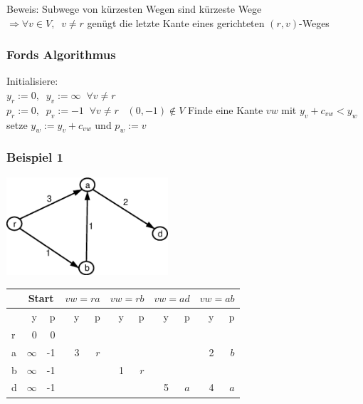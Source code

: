 Beweis: Subwege von kürzesten Wegen sind kürzeste Wege\\
$\Rightarrow \forall v \in V, \; \; v \not=r$ genügt die letzte Kante
eines gerichteten $(r,v)$-Weges

\subsubsection{Fords Algorithmus}

\begin{algorithmic}
\STATE Initialisiere:\\
$y_{r} := 0, \; \; y_{v} := \infty \; \; \forall v \not= r$\\
$p_{r} := 0, \; \; p_{v} := -1 \; \; \forall v \not= r\; \; \; (0,-1) \not
\in V$
\STATE Finde eine Kante $v w$ mit $y_{v} + c_{v w} < y_{w}$
\STATE setze $y_{w} := y_{v} + c_{v w}$ und $p_{w} := v$
\ENDWHILE
\end{algorithmic}

\subsubsection{Beispiel 1}

\includegraphics[width=6cm]{bilder/2-2FordBsp1}

\begin{tabular}{l|r|r|r|r|r|r|r|r|r|r|}
&\multicolumn{2}{|c|}{Start}&\multicolumn{2}{|c|}{$v w=r a$}&
\multicolumn{2}{|c|}{$v w=r b$}&\multicolumn{2}{|c|}{$v w=ad$}&
\multicolumn{2}{|c|}{$v w=a b$}\\ \hline
&y&p&\hspace{2mm}$\;$y&p&\hspace{2mm}$\;$y&p&\hspace{2mm}$\;$y&p&
\hspace{2mm}$\;$y&p\\ \hline
r&0&0&&&&&&&&\\
a&$\infty$&-1&3&$r$&&&&&2&$b$\\ 
b&$\infty$&-1&&&1&$r$&&&&\\
d&$\infty$&-1&&&&&5&$a$&4&$a$
\end{tabular}

